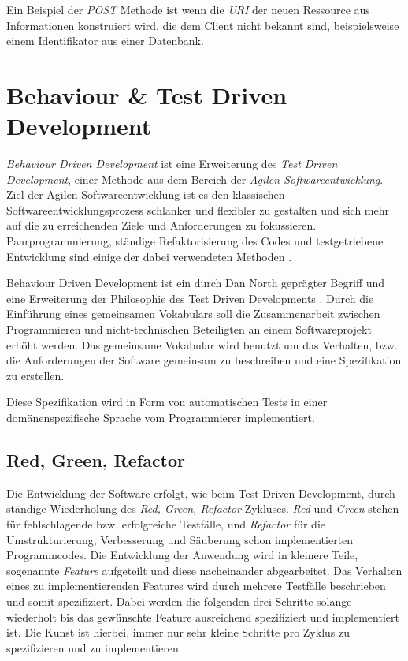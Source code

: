 Ein Beispiel der \textit{POST} Methode ist wenn die \textit{URI} der
neuen Ressource aus Informationen konstruiert wird, die dem Client
nicht bekannt sind, beispielsweise einem Identifikator aus einer
Datenbank.



\section{Behaviour \& Test Driven Development}

\textit{Behaviour Driven Development} ist eine Erweiterung des
\textit{Test Driven Development}, einer Methode aus dem Bereich der
\textit{Agilen Softwareentwicklung}. Ziel der Agilen
Softwareentwicklung ist es den klassischen Softwareentwicklungsprozess
schlanker und flexibler zu gestalten und sich mehr auf die zu
erreichenden Ziele und Anforderungen zu
fokussieren. Paarprogrammierung, ständige Refaktorisierung des Codes
und testgetriebene Entwicklung sind einige der dabei verwendeten
Methoden \cite{wiki:agile}.

Behaviour Driven Development ist ein durch Dan North geprägter Begriff
und eine Erweiterung der Philosophie des Test Driven Developments
\cite{wiki:bdd}. Durch die Einführung eines gemeinsamen Vokabulars
soll die Zusammenarbeit zwischen Programmieren und nicht-technischen
Beteiligten an einem Softwareprojekt erhöht werden. Das gemeinsame
Vokabular wird benutzt um das Verhalten, bzw. die Anforderungen der
Software gemeinsam zu beschreiben und eine Spezifikation zu erstellen.

Diese Spezifikation wird in Form von automatischen Tests in einer
domänen\-spezifische Sprache vom Programmierer implementiert.

\subsection{Red, Green, Refactor}

Die Entwicklung der Software erfolgt, wie beim Test Driven
Development, durch ständige Wiederholung des \textit{Red, Green,
  Refactor} Zykluses. \textit{Red} und \textit{Green} stehen für
fehlschlagende bzw. erfolgreiche Testfälle, und \textit{Refactor} für
die Umstrukturierung, Verbesserung und Säuberung schon implementierten
Programmcodes. Die Entwicklung der Anwendung wird in kleinere Teile,
sogenannte \textit{Feature} aufgeteilt und diese nacheinander
abgearbeitet. Das Verhalten eines zu implementierenden Features wird
durch mehrere Testfälle beschrieben und somit spezifiziert. Dabei
werden die folgenden drei Schritte solange wiederholt bis das
gewünschte Feature ausreichend spezifiziert und implementiert ist. Die
Kunst ist hierbei, immer nur sehr kleine Schritte pro Zyklus zu
spezifizieren und zu implementieren.

